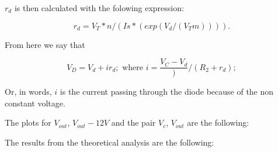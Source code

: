 $r_{d}$ is then calculated with the folowing expression:

\begin{equation}
  r_{d} = V_T*n/( Is*(exp(V_d/(V_Tm)))).
  \label{eq:Rd}
\end{equation}

From here we say that

\begin{equation}
  V_{D} = V_d + ir_d; \text{ where } i = \frac{V_C-V_d})/(R_2+r_d);
  \label{eq:TEO_VD}
\end{equation}

Or, in words, $i$ is the current passing through the diode because of the non constant voltage.

The plots for $V_{out}$, $V_{out} - 12V$ and the pair $V_c$, $V_{out}$ are the following:


The results from the theoretical analysis are the following:
